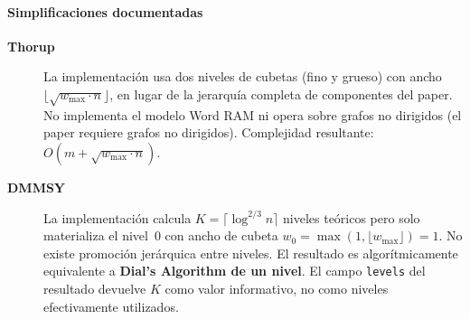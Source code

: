 \paragraph{Simplificaciones documentadas}

\begin{description}
  \item[\textbf{Thorup}] La implementación usa dos niveles de cubetas (fino y
    grueso) con ancho $\lfloor\sqrt{w_{\max}\cdot n}\rfloor$,
    en lugar de la jerarquía completa de componentes del paper.
    No implementa el modelo Word RAM ni opera sobre grafos no dirigidos
    (el paper requiere grafos no dirigidos).
    Complejidad resultante: $O(m + \sqrt{w_{\max}\cdot n})$.

  \item[\textbf{DMMSY}] La implementación calcula $K = \lceil\log^{2/3}n\rceil$
    niveles teóricos pero solo materializa el nivel~0 con ancho de cubeta
    $w_0 = \max\!\left(1,\lfloor w_{\max}\rfloor\right) = 1$.
    No existe promoción jerárquica entre niveles.
    El resultado es algorítmicamente equivalente a \textbf{Dial's Algorithm
    de un nivel}.
    El campo \texttt{levels} del resultado devuelve $K$ como valor informativo,
    no como niveles efectivamente utilizados.
\end{description}
